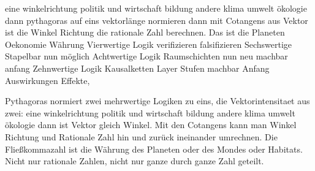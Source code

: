 eine winkelrichtung
politik und wirtschaft bildung
andere
klima umwelt ökologie
dann pythagoras auf eins vektorlänge normieren
dann mit Cotangens aus Vektor ist die Winkel Richtung die rationale Zahl berechnen. Das ist die Planeten Oekonomie Währung
Vierwertige Logik verifizieren falsifizieren
Sechswertige Stapelbar nun möglich
Achtwertige Logik Raumschichten nun neu machbar anfang
Zehnwertige Logik Kausalketten Layer Stufen machbar Anfang Auswirkungen Effekte,

Pythagoras normiert zwei mehrwertige Logiken zu eins, die Vektorintensitaet aus zwei: 
eine winkelrichtung
politik und wirtschaft bildung
andere
klima umwelt ökologie
dann ist Vektor gleich Winkel.
Mit den Cotangens kann man Winkel Richtung und Rationale Zahl hin und zurück ineinander umrechnen. Die Fließkommazahl ist die Währung des Planeten oder des Mondes oder Habitats. Nicht nur rationale Zahlen, nicht nur ganze durch ganze Zahl geteilt.

